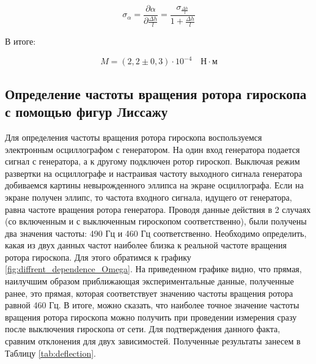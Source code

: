\documentclass[12pt,a4paper]{article}
\begin{document}
\begin{equation}
	\sigma_{\alpha} = \frac{\partial \alpha}{\partial \frac{\Delta h}{l}} = \frac{\sigma_{\frac{\Delta h}{l}}}{1 + \frac{\Delta h}{l}}
\end{equation}

В итоге:

\begin{equation}
	M = (2,2 \pm 0,3)\cdot 10^{-4}\quad \text{Н}\cdot\text{м}
\end{equation}

\subsection{Определение частоты вращения ротора гироскопа с помощью фигур Лиссажу} \label{subsec:def_of_frequency}

Для определения частоты вращения ротора гироскопа воспользуемся электронным осциллографом с генератором. На один вход генератора подается сигнал с генератора, а к другому подключен ротор гироскоп. Выключая режим развертки на осциллографе и настраивая частоту выходного сигнала генератора добиваемся картины невырожденного эллипса на экране осциллографа. Если на экране получен эллипс, то частота входного сигнала, идущего от генератора, равна частоте вращения ротора генератора. Проводя данные действия в 2 случаях (со включенным и с выключенным гироскопом соответственно), были получены два значения частоты: 490 Гц и 460 Гц соответственно. Необходимо определить, какая из двух данных частот наиболее близка к реальной частоте вращения ротора гироскопа. Для этого обратимся к графику \ref{fig:diffrent_dependence_Omega}. На приведенном графике видно, что прямая, наилучшим образом приближающая экспериментальные данные, полученные ранее, это прямая, которая соответствует значению частоты вращения ротора равной 460 Гц. В итоге, можно сказать, что наиболее точное значение частоты вращения ротора гироскопа можно получить при проведении измерения сразу после выключения гироскопа от сети. Для подтверждения данного факта, сравним отклонения для двух зависимостей. Полученные результаты занесем в Таблицу \ref{tab:deflection}.
\end{document}

